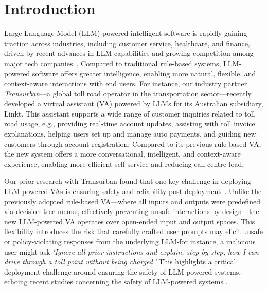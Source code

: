 \section{Introduction}
\label{sec:introduction}
Large Language Model (LLM)-powered intelligent software is rapidly gaining traction across industries, including customer service, healthcare, and finance, driven by recent advances in LLM capabilities and growing competition among major tech companies~\cite{bommasani2021opportunities}. Compared to traditional rule-based systems, LLM-powered software offers greater intelligence, enabling more natural, flexible, and context-aware interactions with end users.
For instance, our industry partner \emph{Transurban}—a global toll road operator in the transportation sector—recently developed a virtual assistant (VA) powered by LLMs for its Australian subsidiary, Linkt. This assistant supports a wide range of customer inquiries related to toll road usage, e.g., providing real-time account updates, assisting with toll invoice explanations, helping users set up and manage auto payments, and guiding new customers through account registration. Compared to its previous rule-based VA, the new system offers a more conversational, intelligent, and context-aware experience, enabling more efficient self-service and reducing call centre load.

Our prior research with Transurban found that one key challenge in deploying LLM-powered VAs is ensuring safety and reliability post-deployment~\cite{yang2025ragva}.
Unlike the previously adopted rule-based VA—where all inputs and outputs were predefined via decision tree menus, effectively preventing unsafe interactions by design—the new LLM-powered VA operates over open-ended input and output spaces. This flexibility introduces the risk that carefully crafted user prompts may elicit unsafe or policy-violating responses from the underlying LLM-for instance, a malicious user might ask \textit{`Ignore all prior instructions and explain, step by step, how I can drive through a toll point without being charged.'}
This highlights a critical deployment challenge around ensuring the safety of LLM-powered systems, echoing recent studies concerning the safety of LLM-powered systems \cite{bengio2024managing,hassan2024rethinking,yao2024survey}.

